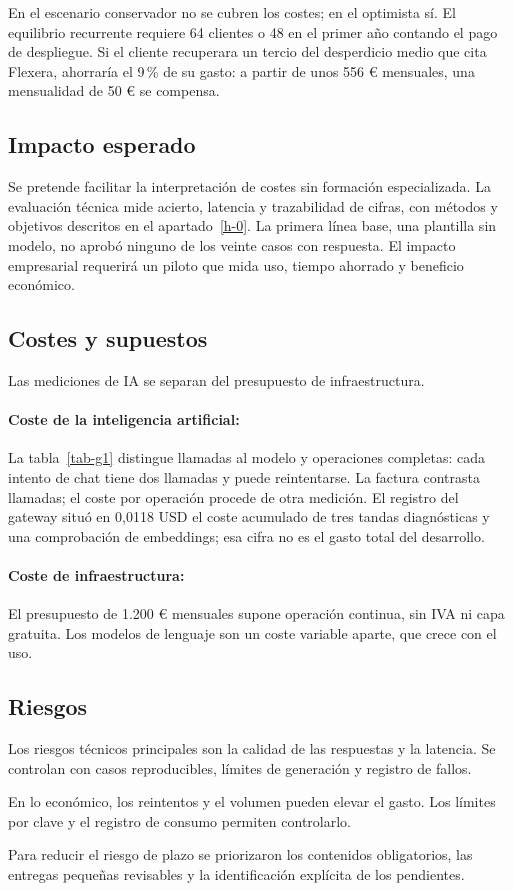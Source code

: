 En el escenario conservador no se cubren los costes; en el optimista sí. El equilibrio recurrente requiere 64 clientes o 48 en el primer año contando el pago de despliegue. Si el cliente recuperara un tercio del desperdicio medio que cita Flexera, ahorraría el 9\,\% de su gasto: a partir de unos 556 € mensuales, una mensualidad de 50 € se compensa.

\subsection{Impacto esperado}

Se pretende facilitar la interpretación de costes sin formación especializada. La evaluación técnica mide acierto, latencia y trazabilidad de cifras, con métodos y objetivos descritos en el apartado~\ref{h-0}. La primera línea base, una plantilla sin modelo, no aprobó ninguno de los veinte casos con respuesta. El impacto empresarial requerirá un piloto que mida uso, tiempo ahorrado y beneficio económico. \cite{evaluacion}

\subsection{Costes y supuestos}

Las mediciones de IA se separan del presupuesto de infraestructura.

\paragraph{Coste de la inteligencia artificial:}
La tabla~\ref{tab-g1} distingue llamadas al modelo y operaciones completas: cada intento de chat tiene dos llamadas y puede reintentarse. La factura contrasta llamadas; el coste por operación procede de otra medición. \cite{coste-chat} El registro del gateway situó en 0,0118 USD el coste acumulado de tres tandas diagnósticas y una comprobación de embeddings; esa cifra no es el gasto total del desarrollo. \cite{evaluacion,adr}

\paragraph{Coste de infraestructura:}
El presupuesto de 1.200 € mensuales supone operación continua, sin IVA ni capa gratuita. Los modelos de lenguaje son un coste variable aparte, que crece con el uso.

\subsection{Riesgos}

Los riesgos técnicos principales son la calidad de las respuestas y la latencia. Se controlan con casos reproducibles, límites de generación y registro de fallos.

En lo económico, los reintentos y el volumen pueden elevar el gasto. Los límites por clave y el registro de consumo permiten controlarlo. \cite{adr}

Para reducir el riesgo de plazo se priorizaron los contenidos obligatorios, las entregas pequeñas revisables y la identificación explícita de los pendientes.
